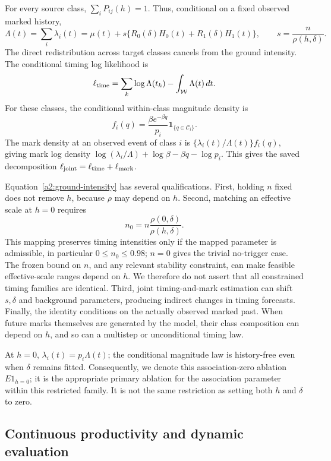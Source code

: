 For every source class, \(\sum_iP_{ij}(h)=1\). Thus, conditional on a
fixed observed marked history,
\begin{equation}
 \Lambda(t)=\sum_i\lambda_i(t)
 =\mu(t)+s\{R_0(\delta)H_0(t)+R_1(\delta)H_1(t)\},
 \qquad s=\frac{n}{\rho(h,\delta)}.
 \label{a2:ground-intensity}
\end{equation}
The direct redistribution across target classes cancels from the ground
intensity. The conditional timing log likelihood is
\[
 \ell_{\rm time}=\sum_k\log\Lambda(t_k)-\int_{\mathcal W}\Lambda(t)\,dt.
\]
For these classes, the conditional within-class magnitude density is
\[
 f_i(q)=\frac{\beta e^{-\beta q}}{p_i}\mathbf1_{\{q\in\mathcal C_i\}}.
\]
The mark density at an observed event of class \(i\) is
\(\{\lambda_i(t)/\Lambda(t)\} f_i(q)\), giving mark log density
\(\log(\lambda_i/\Lambda)+\log\beta-\beta q-\log p_i\).
This gives the saved decomposition
\(\ell_{\rm joint}=\ell_{\rm time}+\ell_{\rm mark}\).

Equation~\eqref{a2:ground-intensity} has several qualifications.
First, holding \(n\) fixed does not remove \(h\), because \(\rho\) may
depend on \(h\). Second, matching an effective scale at \(h=0\) requires
\[
 n_0=n\frac{\rho(0,\delta)}{\rho(h,\delta)}.
\]
This mapping preserves timing intensities only if the mapped parameter is
admissible, in particular \(0\leq n_0\leq0.98\); \(n=0\) gives the
trivial no-trigger case. The frozen bound on \(n\), and any relevant
stability constraint, can make feasible effective-scale ranges depend on
\(h\). We therefore do not assert that all constrained timing families are
identical. Third, joint timing-and-mark estimation can shift \(s,\delta\)
and background parameters, producing indirect changes in timing forecasts.
Finally, the identity conditions on the actually observed marked past.
When future marks themselves are generated by the model, their class
composition can depend on \(h\), and so can a multistep or unconditional
timing law.

At \(h=0\), \(\lambda_i(t)=p_i\Lambda(t)\); the conditional magnitude law
is history-free even when \(\delta\) remains fitted. Consequently, we denote this association-zero ablation \(E1_{h=0}\);
it is the appropriate primary ablation for the association parameter
within this restricted family. It is not the same restriction
as setting both \(h\) and \(\delta\) to zero.

\subsection{Continuous productivity and dynamic evaluation}

